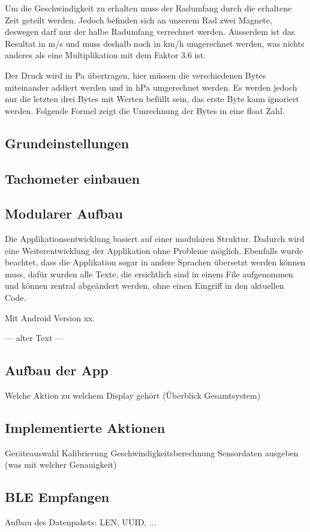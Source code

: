 Um die Geschwindigkeit zu erhalten muss der Radumfang durch die erhaltene Zeit geteilt werden. Jedoch befinden sich an unserem Rad zwei Magnete, deswegen darf nur der halbe Radumfang verrechnet werden. Ausserdem ist das Resultat in m/s und muss deshalb noch in km/h umgerechnet werden, was nichts anderes als eine Multiplikation mit dem Faktor 3.6 ist.

Der Druck wird in Pa übertragen, hier müssen die verschiedenen Bytes miteinander addiert werden und in hPa umgerechnet werden. Es werden jedoch nur die letzten drei Bytes mit Werten befüllt sein, das erste Byte kann ignoriert werden. Folgende Formel zeigt die Umrechnung der Bytes in eine float Zahl.




\subsection{Grundeinstellungen}

\subsection{Tachometer einbauen}

\subsection{Modularer Aufbau}

Die Applikationsentwicklung basiert auf einer modularen Struktur.  Dadurch wird eine Weiterentwicklung der Applikation ohne Probleme möglich. Ebenfalls wurde beachtet, dass die Applikation sogar in andere Sprachen übersetzt werden können muss, dafür wurden alle Texte, die ersichtlich sind in einem File aufgenommen und können zentral abgeändert werden, ohne einen Eingriff in den aktuellen Code.


Mit Android Version xx.

--- alter Text --- 

\subsection{Aufbau der App}

Welche Aktion zu welchem Display gehört (Überblick Gesamtsystem)


\subsection{Implementierte Aktionen}
Geräteauswahl
Kalibrierung
Geschwindigkeitsberechnung
Sensordaten ausgeben (was mit welcher Genauigkeit)

\subsection{BLE Empfangen}

Aufbau des Datenpakets: 
LEN, UUID, ...






